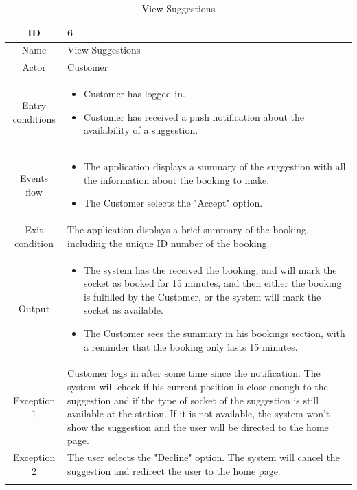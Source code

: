 \begin{longtable}{|c| p{10cm}|}
    \hline ID        & 6\\
    \hline
    Name     & View Suggestions \\
    \hline
    Actor            & Customer\\
    \hline
    Entry conditions & \begin{itemize}[nosep,after=\strut]
        \item Customer has logged in.
        \item Customer has received a push notification about the availability of a suggestion.
    \end{itemize}
        \\
    \hline
    Events flow      & \begin{itemize}[nosep,after=\strut]
        \item The application displays a summary of the suggestion with all the information about the booking to make.
        \item The Customer selects the "Accept" option.
    \end{itemize}\\
    \hline
    Exit condition   & The application displays a brief summary of the booking, including the unique ID number of the booking.\\
    \hline
    Output           & \begin{itemize}
        \item   The system has the received the booking, and will mark the socket as booked for 15 minutes, and then either the booking is fulfilled by the Customer, or the system will mark the socket as available.
        \item   The Customer sees the summary in his bookings section, with a reminder that the booking only lasts 15 minutes.
    \end{itemize}
    \\
    \hline
    \hline
    Exception 1      &  Customer logs in after some time since the notification. The system will check if his current position is close enough to the suggestion and if the type of socket of the suggestion is still available at the station.
    If it is not available, the system won't show the suggestion and the user will be directed to the home page.\\
    \hline
    Exception 2      &  The user selects the "Decline" option. The system will cancel the suggestion and redirect the user to the home page.\\
    \hline
    \caption{View Suggestions}\\
\end{longtable}


